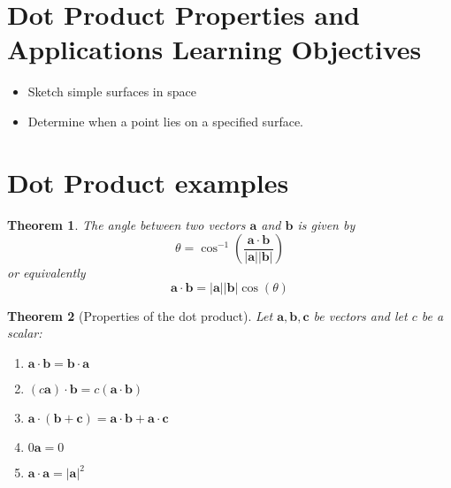 \documentclass[12pt]{exam}
\newcommand{\ba}{\bm{a}}
\newcommand{\bb}{\bm{b}}
\newcommand{\bc}{\bm{c}}
\newtheorem*{theorem}{Theorem}
\begin{document}
\section*{Dot Product Properties and Applications Learning Objectives}
  \begin{itemize}
    \item{
      Sketch simple surfaces in space
    }
    \item{
      Determine when a point lies on a specified surface.
    }
  \end{itemize}
  
\section*{Dot Product examples}
  \begin{theorem}
    The angle between two vectors \(\bm{a}\) and \(\bm{b}\) is given by 
    \[
      \theta = \cos^{-1}\left( \dfrac{\bm{a}\cdot\bm{b}}{|\bm{a}||\bm{b}|} \right)
    \]
    or equivalently
    \[
        \bm{a}\cdot\bm{b} = |\bm{a}||\bm{b}|\cos(\theta)
    \]
  \end{theorem}
\begin{theorem}[Properties of the dot product] Let \(\bm{a},\bm{b},\bm{c}\) be vectors and let \(c\) be a scalar:

  \begin{enumerate}[label=\((\alph*)\)]
    \item \(\ba\cdot\bb = \bb\cdot \ba\)
    \item \((c\ba)\cdot \bb = c(\ba\cdot \bb)\)
    \item \(\ba\cdot(\bb+\bc) = \ba\cdot\bb+\ba\cdot\bc \)
    \item \(0\ba = 0\)
    \item \(\ba\cdot\ba=|\ba|^2\)
  \end{enumerate}
\end{theorem}    
\end{document}
